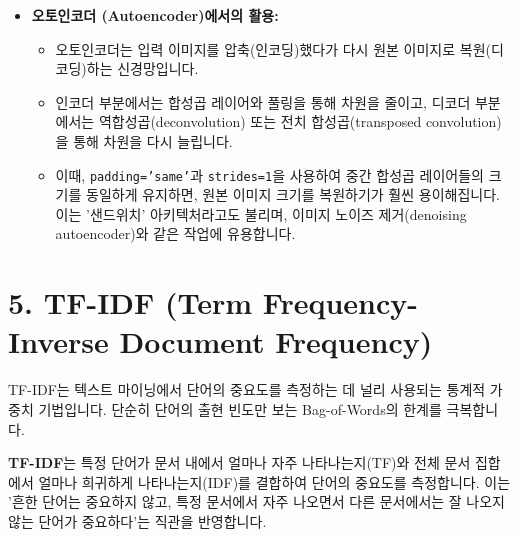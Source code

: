 \documentclass[11pt,a4paper]{article}
\theoremstyle{definition}
\newcommand{\newsection}[1]{\newpage\section{#1}}
\begin{document}
\begin{itemize}
\begin{itemize}
        \item \textbf{비대칭성:} 입력 데이터의 크기가 풀링 필터 크기로 나누어 떨어지지 않을 경우, 남는 가장자리 픽셀들은 \textbf{버려집니다.} 이는 패딩이 없는 경우에도 발생하는 비대칭적인 동작입니다.
    \end{itemize}
    \item \textbf{오토인코더 (Autoencoder)에서의 활용:}
    \begin{itemize}
        \item 오토인코더는 입력 이미지를 압축(인코딩)했다가 다시 원본 이미지로 복원(디코딩)하는 신경망입니다.
        \item 인코더 부분에서는 합성곱 레이어와 풀링을 통해 차원을 줄이고, 디코더 부분에서는 역합성곱(deconvolution) 또는 전치 합성곱(transposed convolution)을 통해 차원을 다시 늘립니다.
        \item 이때, \texttt{padding='same'}과 \texttt{strides=1}을 사용하여 중간 합성곱 레이어들의 크기를 동일하게 유지하면, 원본 이미지 크기를 복원하기가 훨씬 용이해집니다. 이는 '샌드위치' 아키텍처라고도 불리며, 이미지 노이즈 제거(denoising autoencoder)와 같은 작업에 유용합니다.
    \end{itemize}
\end{itemize}

\newsection{5. TF-IDF (Term Frequency-Inverse Document Frequency)}
TF-IDF는 텍스트 마이닝에서 단어의 중요도를 측정하는 데 널리 사용되는 통계적 가중치 기법입니다. 단순히 단어의 출현 빈도만 보는 Bag-of-Words의 한계를 극복합니다.

\begin{tcolorbox}[summarybox, title=TF-IDF의 개념 및 필요성]
\textbf{TF-IDF}는 특정 단어가 문서 내에서 얼마나 자주 나타나는지(TF)와 전체 문서 집합에서 얼마나 희귀하게 나타나는지(IDF)를 결합하여 단어의 중요도를 측정합니다.
이는 '흔한 단어는 중요하지 않고, 특정 문서에서 자주 나오면서 다른 문서에서는 잘 나오지 않는 단어가 중요하다'는 직관을 반영합니다.
\end{tcolorbox}
\end{document}
